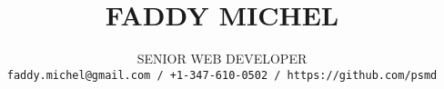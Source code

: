 \title{\uppercase{Faddy Michel}}
\author{\uppercase{Senior Web Developer}\\
\texttt{faddy.michel@gmail.com / +1-347-610-0502 / https://github.com/psmd}}
\date{}
\maketitle
